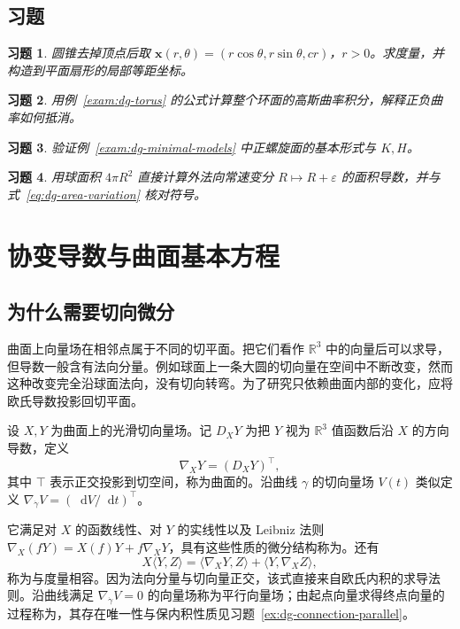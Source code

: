 \documentclass[UTF8,12pt,a4paper,fontset=fandol]{ctexbook}
\newcommand{\R}{\mathbb R}
\newcommand{\dd}{\mathop{}\!\mathrm d}
\newcommand{\ip}[2]{\langle #1,#2\rangle}
\newtheorem{exercise}{习题}[chapter]
\begin{document}
\section{习题}
\begin{exercise}\label{ex:dg-examples-cone}
圆锥去掉顶点后取 $\mathbf x(r,\theta)=(r\cos\theta,r\sin\theta,cr)$，$r>0$。求度量，并构造到平面扇形的局部等距坐标。
\end{exercise}
\begin{exercise}\label{ex:dg-examples-torus}
用例~\ref{exam:dg-torus} 的公式计算整个环面的高斯曲率积分，解释正负曲率如何抵消。
\end{exercise}
\begin{exercise}\label{ex:dg-examples-helicoid}
验证例~\ref{exam:dg-minimal-models} 中正螺旋面的基本形式与 $K,H$。
\end{exercise}
\begin{exercise}\label{ex:dg-examples-sphere-variation}
用球面积 $4\pi R^2$ 直接计算外法向常速变分 $R\mapsto R+\varepsilon$ 的面积导数，并与式~\eqref{eq:dg-area-variation} 核对符号。
\end{exercise}

\chapter{协变导数与曲面基本方程}
\label{chap:dg-connection}

\section{为什么需要切向微分}
曲面上向量场在相邻点属于不同的切平面。把它们看作 $\R^3$ 中的向量后可以求导，但导数一般含有法向分量。例如球面上一条大圆的切向量在空间中不断改变，然而这种改变完全沿球面法向，没有切向转弯。为了研究只依赖曲面内部的变化，应将欧氏导数投影回切平面。

\begin{definition}[协变导数]
设 $X,Y$ 为曲面上的光滑切向量场。记 $D_XY$ 为把 $Y$ 视为 $\R^3$ 值函数后沿 $X$ 的方向导数，定义
\[
 \nabla_XY=(D_XY)^\top,
\]
其中 $\top$ 表示正交投影到切空间，称为曲面的。沿曲线 $\gamma$ 的切向量场 $V(t)$ 类似定义 $\nabla_{\dot\gamma}V=(\dd V/\dd t)^\top$。
\end{definition}
它满足对 $X$ 的函数线性、对 $Y$ 的实线性以及 Leibniz 法则 $\nabla_X(fY)=X(f)Y+f\nabla_XY$，具有这些性质的微分结构称为。还有
\begin{equation}
 X\ip YZ=\ip{\nabla_XY}Z+\ip Y{\nabla_XZ},
 \label{eq:dg-metric-compatible}
\end{equation}
称为与度量相容。因为法向分量与切向量正交，该式直接来自欧氏内积的求导法则。沿曲线满足 $\nabla_{\dot\gamma}V=0$ 的向量场称为平行向量场；由起点向量求得终点向量的过程称为，其存在唯一性与保内积性质见习题~\ref{ex:dg-connection-parallel}。
\end{document}
